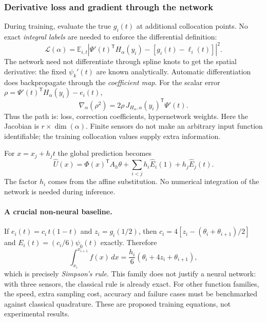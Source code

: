 \subsubsection{Derivative loss and gradient through the network}

During training, evaluate the true $g_i(t)$ at additional
collocation points. No exact \emph{integral labels} are
needed to enforce the differential definition:
\begin{equation}
  \boxed{\mathcal L(\alpha)=\mathbb E_{i,t}
  \left|\Psi'(t)^{\mathsf T}H_\alpha(y_i)
  -[g_i(t)-\ell_i(t)]\right|^2.}
  \label{eq:scho-defect-loss}
\end{equation}
The network need not differentiate through spline knots
to get the spatial derivative: the fixed $\psi_k'(t)$
are known analytically. Automatic differentiation
does backpropagate through the \emph{coefficient map}.
For the scalar error
$\rho=\Psi'(t)^{\mathsf T}H_\alpha(y_i)-e_i(t)$,
\begin{equation}
  \boxed{\nabla_\alpha(\rho^2)=2\rho\,
    J_{H_\alpha,\alpha}(y_i)^{\mathsf T}\Psi'(t).}
  \label{eq:scho-defect-backprop}
\end{equation}
Thus the path is: loss, correction coefficients,
hypernetwork weights. Here the Jacobian is
$r\times\dim(\alpha)$. Finite sensors do not make an
arbitrary input function identifiable; the training
collocation values supply extra information.

For $x=x_j+h_jt$ the global prediction becomes
\begin{equation}
  \boxed{\widehat U(x)=\Phi(x)^{\mathsf T}A_h\theta
    +\sum_{i<j}h_i\widehat E_i(1)+h_j\widehat E_j(t).}
  \label{eq:scho-defect-global}
\end{equation}
The factor $h_i$ comes from the affine substitution.
No numerical integration of the network is needed
during inference.

\paragraph{A crucial non-neural baseline.}
If $e_i(t)=c_i\,t(1-t)$ and $z_i=g_i(1/2)$, then
$c_i=4[z_i-(\theta_i+\theta_{i+1})/2]$ and
$E_i(t)=(c_i/6)\psi_0(t)$ exactly. Therefore
\begin{equation}
  \int_{x_i}^{x_{i+1}}f(x)\,dx
  =\frac{h_i}{6}(\theta_i+4z_i+\theta_{i+1}),
  \label{eq:scho-simpson}
\end{equation}
which is precisely \emph{Simpson's rule}. This family
does not justify a neural network: with three sensors,
the classical rule is already exact. For other function
families, the speed, extra sampling cost, accuracy and
failure cases must be benchmarked against classical
quadrature. These are proposed training equations,
not experimental results.




